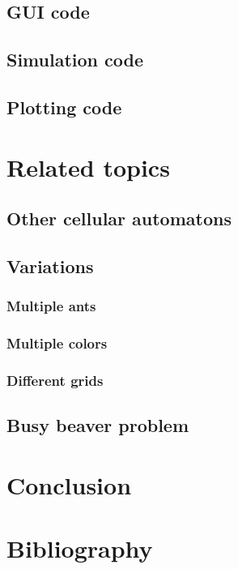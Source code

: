 \documentclass{article}
\begin{document}
\subsection{GUI code}
\subsection{Simulation code}
\subsection{Plotting code}

\section{Related topics}
\subsection{Other cellular automatons}
\subsection{Variations}
\subsubsection{Multiple ants}
\subsubsection{Multiple colors}
\subsubsection{Different grids}
\subsection{Busy beaver problem}


\section{Conclusion}


\section{Bibliography}
\end{document}
